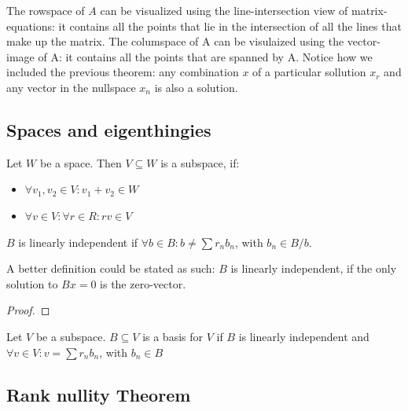 The rowspace of $A$ can be visualized using the line-intersection view of matrix-equations: it contains all the points that lie in the intersection of all the lines that make up the matrix. The columspace of A can be visulaized using the vector-image of A: it contains all the points that are spanned by A. 
Notice how we included the previous theorem: any combination $x$ of a particular sollution $x_r$ and any vector in the nullspace $x_n$ is also a solution.


\subsection{Spaces and eigenthingies}

\begin{definition}
Let $W$ be a space. Then $V \subseteq W$ is a subspace, if: 
    \begin{itemize}
        \item $\forall v_1, v_2 \in V: v_1 + v_2 \in W$
        \item $\forall v \in V: \forall r \in R: rv \in V$
    \end{itemize}
\end{definition}


\begin{definition}
    $B$ is linearly independent if $\forall b \in B: b \neq \sum r_n b_n$, with $b_n \in B/b$. 
\end{definition}

\begin{theorem}
  A better definition could be stated as such: $B$ is linearly independent, if the only solution to $Bx = 0$ is the zero-vector.
\end{theorem}

\begin{proof}
\end{proof}

\begin{definition}
    Let $V$ be a subspace. $B \subseteq V$ is a basis for $V$ if $B$ is linearly independent and $\forall v \in V: v = \sum r_n b_n$, with $b_n \in B$
\end{definition}


\subsection{Rank nullity Theorem}

